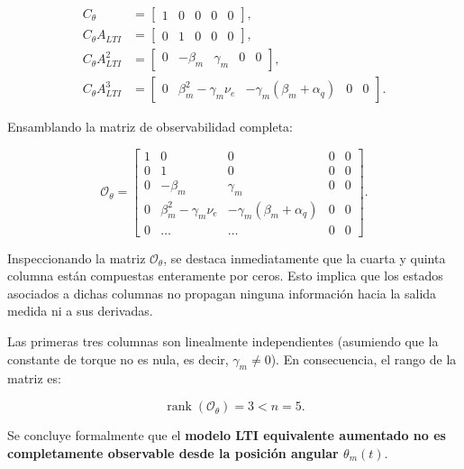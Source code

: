 \documentclass[10pt,a4paper]{article}
\begin{document}
\begin{align*}
    C_\theta &= \begin{bmatrix} 1 & 0 & 0 & 0 & 0 \end{bmatrix}, \\[2mm]
    C_\theta A_{LTI} &= \begin{bmatrix} 0 & 1 & 0 & 0 & 0 \end{bmatrix}, \\[2mm]
    C_\theta A_{LTI}^2 &= \begin{bmatrix} 0 & -\beta_m & \gamma_m & 0 & 0 \end{bmatrix}, \\[2mm]
    C_\theta A_{LTI}^3 &= \begin{bmatrix} 0 & \beta_m^2-\gamma_m\nu_e & -\gamma_m(\beta_m+\alpha_q) & 0 & 0 \end{bmatrix}.
\end{align*}

Ensamblando la matriz de observabilidad completa:

\begin{equation}
    \mathcal{O}_\theta =
    \begin{bmatrix}
        1 & 0 & 0 & 0 & 0\\[2mm]
        0 & 1 & 0 & 0 & 0\\[2mm]
        0 & -\beta_m & \gamma_m & 0 & 0\\[2mm]
        0 & \beta_m^2-\gamma_m\nu_e & -\gamma_m(\beta_m+\alpha_q) & 0 & 0\\[2mm]
        0 & \dots & \dots & 0 & 0
    \end{bmatrix}.
\end{equation}

Inspeccionando la matriz $\mathcal{O}_\theta$, se destaca inmediatamente que la cuarta y quinta columna están compuestas enteramente por ceros. Esto implica que los estados asociados a dichas columnas no propagan ninguna información hacia la salida medida ni a sus derivadas. 

Las primeras tres columnas son linealmente independientes (asumiendo que la constante de torque no es nula, es decir, $\gamma_m \neq 0$). En consecuencia, el rango de la matriz es:

\begin{equation}
    \operatorname{rank}(\mathcal{O}_\theta) = 3 < n = 5.
\end{equation}

Se concluye formalmente que el \textbf{modelo LTI equivalente aumentado no es completamente observable desde la posición angular $\theta_m(t)$}.
\end{document}
